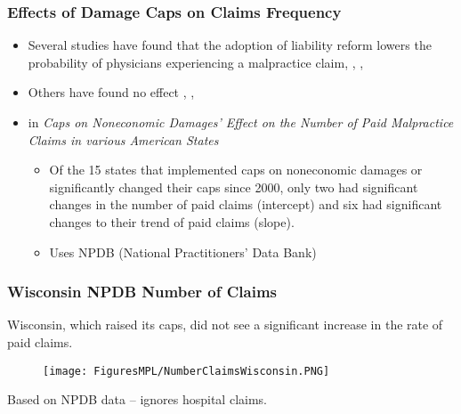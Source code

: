 \documentclass[serif,10pt]{beamer}
\begin{document}
\begin{frame}
\frametitle{Effects of Damage Caps on Claims Frequency}
  \begin{itemize}
\item Several studies have found that the adoption of liability reform lowers the probability of physicians experiencing a malpractice claim, \cite{avraham2007empirical}, \cite{danzon1986frequency}, \cite{kessler2002liability}
\item Others have found no effect \cite{danzon1984frequency}, \cite{zuckerman1990effects}, \cite{durrance2009noneconomic}
\item \cite{muhlestein2016caps} in {\small \textit{Caps on Noneconomic Damages' Effect on the Number of Paid Malpractice Claims in various American States}}
\begin{itemize}
\item Of the 15 states that implemented caps on noneconomic damages or significantly changed their caps since 2000, only two had significant changes in the number of paid claims (intercept) and six had significant changes to their trend of paid claims (slope).
\item Uses NPDB (National Practitioners' Data Bank)
\end{itemize}

\end{itemize}
\end{frame}

\begin{frame}
\frametitle{Wisconsin NPDB Number of Claims}

Wisconsin, which raised its caps, did not see a significant increase in the rate of paid claims.
\begin{figure}[htp]
\begin{center}
    \texttt{[image: FiguresMPL/NumberClaimsWisconsin.PNG]}
    \end{center}
\end{figure}
\vspace{-.2in}
Based on NPDB data -- ignores hospital claims.

\end{frame}
\end{document}
